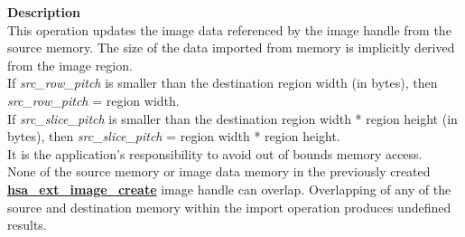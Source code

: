 \documentclass[final,oneside]{book}
\newcommand{\reffun}[1]{\textbf{#1}}
\begin{document}
\vspace{-2mm}\noindent\textbf{Description}\\
This operation updates the image data referenced by the image handle from the source memory. The size of the data imported from memory is implicitly derived from the image region.\\[2mm]
If \textit{src_\-row_\-pitch} is smaller than the destination region width (in bytes), then \textit{src_\-row_\-pitch} = region width.\\[2mm]
If \textit{src_\-slice_\-pitch} is smaller than the destination region width * region height (in bytes), then \textit{src_\-slice_\-pitch} = region width * region height.\\[2mm]
It is the application's responsibility to avoid out of bounds memory access.\\[2mm]
None of the source memory or image data memory in the previously created \hyperlink{group__ext-images_1ga985562c68508d4d8b0edcfd0729b6d49}{\reffun{hsa_\-ext_\-image_\-create}} image handle can overlap. Overlapping of any of the source and destination memory within the import operation produces undefined results. 
\end{document}
